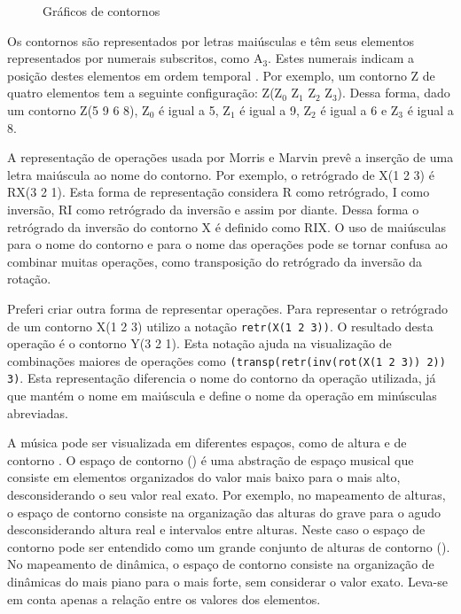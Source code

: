 \begin{figure}
  \centering
  \subfloat[contorno P(0 3 1 2)]{
    \texttt{[image: c-0312]}
    \label{fig:cseg-0312}
  }
  \subfloat[contorno Q(0 2 1 3)]{
    \texttt{[image: c-0213]}
    \label{fig:cseg-0213}
  }
  \subfloat[contorno R(2 0 3 1)]{
    \texttt{[image: c-2031]}
    \label{fig:cseg-2031}
  }
  \caption{Gráficos de contornos}
  \label{fig:graficos-cseg}
\end{figure}

Os contornos são representados por letras maiúsculas e têm seus
elementos representados por numerais subscritos, como A$_3$. Estes
numerais indicam a posição destes elementos em ordem temporal
\cite{marvin.ea87:relating}. Por exemplo, um contorno Z de quatro
elementos tem a seguinte configuração: Z(Z$_0$ Z$_1$ Z$_2$
Z$_3$). Dessa forma, dado um contorno Z(5 9 6 8), Z$_0$ é igual a 5,
Z$_1$ é igual a 9, Z$_2$ é igual a 6 e Z$_3$ é igual a 8.

A representação de operações usada por Morris e Marvin prevê a
inserção de uma letra maiúscula ao nome do contorno. Por exemplo, o
retrógrado de X(1 2 3) é RX(3 2 1). Esta forma de representação
considera R como retrógrado, I como inversão, RI como retrógrado da
inversão e assim por diante. Dessa forma o retrógrado da inversão do
contorno X é definido como RIX. O uso de maiúsculas para o nome do
contorno e para o nome das operações pode se tornar confusa ao
combinar muitas operações, como transposição do retrógrado da inversão
da rotação.

Preferi criar outra forma de representar operações. Para representar o
retrógrado de um contorno X(1 2 3) utilizo a notação
\verb!retr(X(1 2 3))!. O resultado desta operação é o contorno Y(3 2
1). Esta notação ajuda na visualização de combinações maiores de
operações como \verb!(transp(retr(inv(rot(X(1 2 3)) 2)) 3)!. Esta
representação diferencia o nome do contorno da operação utilizada, já
que mantém o nome em maiúscula e define o nome da operação em
minúsculas abreviadas.

A música pode ser visualizada em diferentes espaços, como de altura e
de contorno \cite{morris87:composition}.
O espaço de contorno () é uma abstração
de espaço musical que consiste em elementos organizados do valor mais
baixo para o mais alto, desconsiderando o seu valor real exato. Por
exemplo, no mapeamento de alturas, o espaço de contorno consiste na
organização das alturas do grave para o agudo desconsiderando altura
real e intervalos entre alturas. Neste caso o espaço de contorno pode
ser entendido como um grande conjunto de alturas de contorno
(). No mapeamento de dinâmica, o espaço
de contorno consiste na organização de dinâmicas do mais piano para o
mais forte, sem considerar o valor exato. Leva-se em conta apenas a
relação entre os valores dos elementos.

